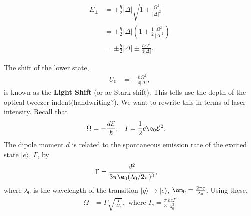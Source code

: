 \documentclass[a4paper, 11pt, normalem]{report}
\begin{document}
\begin{multicols}{2}
\begin{figure}[H]
    \centering
\end{figure}
\columnbreak
\begin{align}
    E_\pm &= \pm\frac{\hbar}{2}|\Delta|\sqrt{1+\frac{\Omega^2}{|\Delta|^2}} \\
          &= \pm\frac{\hbar}{2}|\Delta|\left(1+\frac12\frac{\Omega^2}{|\Delta|^2}\right) \\
          &= \pm\frac{\hbar}{2}|\Delta|\pm \frac{\hbar\Omega^2}{4|\Delta|}.
\end{align}
\end{multicols}
The shift of the lower state,
\begin{align}
    U_0 &= -\frac{\hbar\Omega^2}{4|\Delta|},
\end{align}
is known as the \textbf{Light Shift} (or ac-Stark shift).
This tells use the depth of the optical tweezer indent(handwriting?).
We want to rewrite this in terms of laser intensity.
Recall that
\begin{align}
    \Omega &= -\frac{d\mathcal{E}}{\hbar}, & I &= \frac12 c\e_0\mathcal{E}^2.
\end{align}
The dipole moment $d$ is related to the spontaneous emission rate of the excited state $|e\rangle$, $\Gamma$, by
\begin{align}
    \Gamma &= \frac{d^2}{3\pi\e_0(\lambda_0/2\pi)^3},
\end{align}
where $\lambda_0$ is the wavelength of the transition $|g\rangle\to|e\rangle$, $\om_0=\frac{2\pi c}{\lambda_0}$.
Using these,
\begin{align}
    \Omega &= \Gamma\sqrt{\frac{I}{2I_s}}, \text{ where } I_s = \frac{\pi}{3}\frac{hc\Gamma}{\lambda_0^3}
\end{align}
\end{document}
